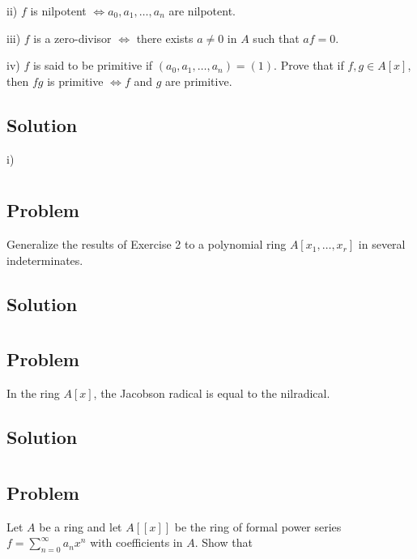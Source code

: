 \documentclass[book,12pt,oneside,openany]{memoir}
\begin{document}
ii) $f$ is nilpotent $\Leftrightarrow a_0, a_1, \ldots, a_n$ are nilpotent.

iii) $f$ is a zero-divisor $\Leftrightarrow$ there exists $a \neq 0$ in $A$ such that $af = 0$.

iv) $f$ is said to be primitive if $(a_0, a_1, \ldots, a_n) = (1)$. Prove that if $f,g \in A[x]$, then $fg$ is primitive $\Leftrightarrow f$ and $g$ are primitive.

\subsection{Solution}

i) 


\section{}
\subsection{Problem}
Generalize the results of Exercise 2 to a polynomial ring $A[x_1, \ldots, x_r]$ in several indeterminates.

\subsection{Solution}

\section{}
\subsection{Problem}
In the ring $A[x]$, the Jacobson radical is equal to the nilradical.

\subsection{Solution}


\section{}
\subsection{Problem}
Let $A$ be a ring and let $A[[x]]$ be the ring of formal power series $f = \sum_{n=0}^{\infty} a_n x^n$ with coefficients in $A$. Show that 
\end{document}
